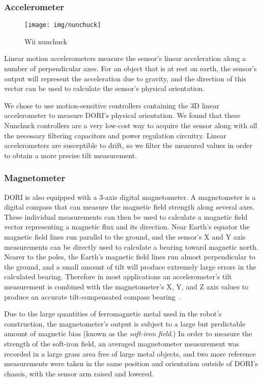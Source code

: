     \subsubsection*{Accelerometer}
    \begin{wrapfigure}{l}{0.2\textwidth}
        \centering
        \texttt{[image: img/nunchuck]}
        \caption*{Wii nunchuck}
    \end{wrapfigure}
    Linear motion accelerometers measure the sensor's linear acceleration along a number of perpendicular axes. For an object that is at rest on earth, the sensor's output will represent the acceleration due to gravity, and the direction of this vector can be used to calculate the sensor's physical orientation. 

    We chose to use  motion-sensitive controllers containing the  3D linear accelerometer to measure DORI's physical orientation. We found that these Nunchuck controllers are a very low-cost way to acquire the  sensor along with all the necessary filtering capacitors and power regulation circuitry. Linear accelerometers are susceptible to drift, so we filter the measured values in order to obtain a more precise tilt measurement. 

    \subsubsection*{Magnetometer}
    DORI is also equipped with a  3-axis digital magnetometer. A magnetometer is a digital compass that can measure the magnetic field strength along several axes. These individual measurements can then be used to calculate a magnetic field vector representing a magnetic flux and its direction. Near Earth's equator the magnetic field lines run parallel to the ground, and the sensor's X and Y axis measurements can be directly used to calculate a bearing toward magnetic north. Nearer to the poles, the Earth's magnetic field lines run almost perpendicular to the ground, and a small amount of tilt will produce extremely large errors in the calculated bearing. Therefore in most applications an accelerometer's tilt measurement is combined with the magnetometer's X, Y, and Z axis values to produce an accurate tilt-compensated compass bearing~\cite{tilt}.

    Due to the large quantities of ferromagnetic metal used in the robot's construction, the magnetometer's output is subject to a large but predictable amount of magnetic bias (known as the \emph{soft-iron field}.) In order to measure the strength of the soft-iron field, an averaged magnetometer measurement was recorded in a large grass area free of large metal objects, and two more reference measurements were taken in the same position and orientation outside of DORI's chassis, with the sensor arm raised and lowered.
    
